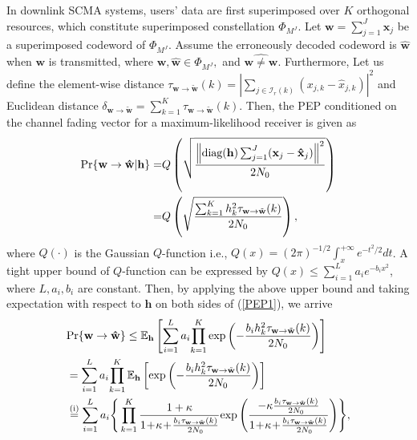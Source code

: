 \documentclass[journal]{IEEEtran}
\begin{document}
In downlink SCMA systems, users' data are first superimposed over $K$ orthogonal resources, which constitute superimposed  constellation ${\Phi }_{M^J}$.    Let $ \mathbf{w} = \sum _{j=1}^{J}{{{\mathbf{x}}_{j}}}$ be a superimposed codeword of ${{\Phi }_{ {M^J}}}$.  Assume the  erroneously decoded codeword is $\hat{\mathbf{w}}$ when  $ \mathbf{w}$ is transmitted, where  $\mathbf{w}, \hat{\mathbf{w}}  \in {{\Phi }_{M^J}}, $ and $ \hat{\mathbf{w} \neq \mathbf{w}}$. Furthermore, Let us define the element-wise distance $\tau _{{{\mathbf w}} \rightarrow {\tilde{\mathbf{w}}}}(k) =   \left|  \sum\nolimits_{j \in \boldsymbol{\mathcal {I}}_r(k)}(x_{j,k}- \hat{x}_{j,k}) \right|^2 $ and Euclidean distance $  \delta_{{{\mathbf w}} \rightarrow {\tilde{\mathbf{w}}}} = \sum _{k=1}^{K} \tau _{{{\mathbf w}} \rightarrow {\tilde{\mathbf{w}}}}(k)$. 
Then, the  PEP conditioned on  the  channel fading vector  for a maximum-likelihood receiver  is given as \cite{boutros1996good}
\begin{equation}
\label{PEP1}
 \small
 \begin{aligned}
\text{Pr} \{\mathbf{w} \to \mathbf{\hat{w}} | \mathbf{h} \} = &   Q\left(\sqrt {\frac{\left\Vert \text{diag} (\mathbf{h}) \sum\nolimits_{j = 1}^J (\mathbf{x}_j - \mathbf{\hat{x}}_j) \right\Vert^2}{2N_0}} \right) \\
= & Q\left(\sqrt {\frac{ \sum\nolimits_{k = 1}^K  h_k^2 \tau _{{{\mathbf w}} \rightarrow {\tilde{\mathbf{w}}}}(k)}{2N_0}} \right) ,
 \end{aligned}
\end{equation}
where  $Q \left( \cdot \right)$ is the Gaussian $ Q $-function i.e., $Q(x)=(2\pi)^{-1/2}\int _{x}^{+\infty }e^{-t^{2}/2}dt$. A  tight upper bound of $Q$-function can be expressed by  $ Q \left( x \right)  \leq \sum \nolimits _{i=1}^{L} a_i e^{-b_i x^2}$, where $L, a_i, b_i$ are constant.  Then,   by applying the above upper bound and taking expectation with respect to $\mathbf h$ on both sides of (\ref{PEP1}), we arrive
  \begin{equation}
  \label{PEP3}
   \small
\begin{aligned} 
&\text{Pr}  \{\mathbf{w} \to \mathbf{\hat{w}}  \}   \leq  \mathbb E_{\mathbf h} \left [ \sum \limits _{i=1}^{L} a_i{\prod \limits _{k = 1}^K {  \exp \left({ -\frac{{ { b_i h_k^2 { \tau _{{{\mathbf w}} \rightarrow {\tilde{\mathbf{w}}}}(k) } }}}{{ {2N_0}}}} \right) } }\right ]\\
 & =   \sum \limits _{i=1}^{L} a_i{\prod \limits _{k = 1}^K { \mathbb E_{\mathbf h} \left [ \exp \left({ -\frac{{ { b_i h_k^2 { \tau _{{{\mathbf w}} \rightarrow {\tilde{\mathbf{w}}}}(k) } }}}{{ {2N_0}}}} \right)\right ] } }\\
 &  \overset{(\mathrm i)}{=}    \sum \limits _{i=1}^{L} a_i  \Bigg \{ \prod \limits _{k = 1}^K 
\frac{1+\kappa}{1\!+ \! \kappa \!+\!\frac{{ b_i \tau _{{{\mathbf w}} \rightarrow {\tilde{\mathbf{w}}}}(k)  }  }{2N_0} }    {  {\exp \left({ \frac{- \kappa  \frac{b_i \tau _{{{\mathbf w}} \rightarrow {\tilde{\mathbf{w}}}}(k)}{2N_0}   }{1\!+ \! \kappa \!+\!\frac{{  b_i \tau _{{{\mathbf w}} \rightarrow {\tilde{\mathbf{w}}}}(k)} }{2N_0} }} \right) } }\Bigg \}, 
\end{aligned}
  \end{equation}
\end{document}
